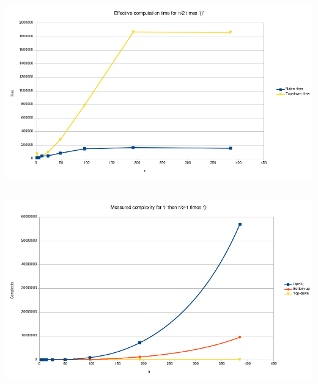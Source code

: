 \documentclass[twocolumn]{article}
\begin{document}
\newpage
\subsection{ }
\begin{center}
  \label{fig:plr3}
  \includegraphics[width=\textwidth]{paren/time_paren_left_right}\\
\end{center}

\newpage
\subsection{ }
\begin{center}
  \label{fig:cplr}
  \includegraphics[width=\textwidth]{paren/complexity_closing_paren_left_right}
\end{center}
\newpage
\end{document}
